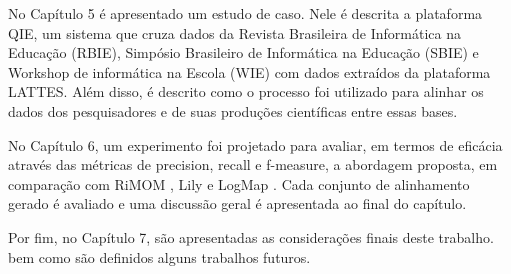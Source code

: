 No Capítulo 5 é apresentado um estudo de caso. Nele é descrita a plataforma QIE, um sistema que cruza dados da Revista Brasileira de Informática na Educação (RBIE), Simpósio Brasileiro de Informática na Educação (SBIE) e Workshop de informática na Escola (WIE) com dados extraídos da plataforma LATTES. Além disso, é descrito como o processo foi utilizado para alinhar os dados dos pesquisadores e de suas produções científicas entre essas bases.

No Capítulo 6, um experimento foi projetado para avaliar, em termos de eficácia através das métricas de precision, recall e f-measure, a abordagem proposta, em comparação com RiMOM \cite{zhang2015rimom} , Lily \cite{wang2015lily} e LogMap \cite{jimenez2015logmap}. Cada conjunto de alinhamento gerado é avaliado e uma discussão geral é apresentada ao final do capítulo.

Por fim, no Capítulo 7, são apresentadas as considerações finais deste trabalho. bem como são definidos alguns trabalhos futuros.
